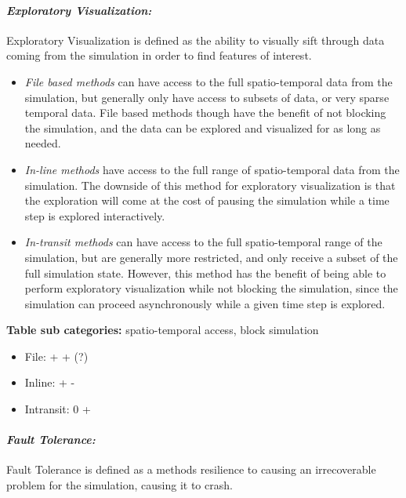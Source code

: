 \paragraph{\emph{Exploratory Visualization:}}
Exploratory Visualization is defined as the ability to visually sift through data coming from the simulation in order to find features of interest.
\begin{itemize}
    \item \emph{File based methods} can have access to the full spatio-temporal data from the simulation, but generally only have access to subsets of data, or very sparse temporal data. File based methods though have the benefit of not blocking the simulation, and the data can be explored and visualized for as long as needed.

    \item \emph{In-line methods} have access to the full range of spatio-temporal data from the simulation. The downside of this method for exploratory visualization is that the exploration will come at the cost of pausing the simulation while a time step is explored interactively.
    
    \item \emph{In-transit methods} can have access to the full spatio-temporal range of the simulation, but are generally more restricted, and only receive a subset of the full simulation state. However, this method has the benefit of being able to perform exploratory visualization while not blocking the simulation, since the simulation can proceed asynchronously while a given time step is explored.
\end{itemize}
\textbf{Table sub categories:} spatio-temporal access, block simulation
\begin{itemize}
    \item File: + + (?)
    \item Inline: + -
    \item Intransit: 0 +
\end{itemize}

\paragraph{\emph{Fault Tolerance:}}
Fault Tolerance is defined as a methods resilience to causing an irrecoverable problem for the simulation, causing it to crash. 

